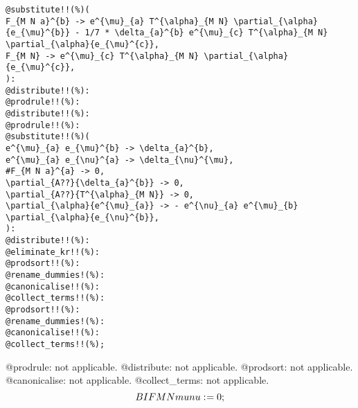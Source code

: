 \documentclass[11pt]{article}
\def\specialcolon{\mathrel{\mathop{:}}\hspace{-.5em}}
\begin{document}
{\color[named]{Blue}\begin{verbatim}
@substitute!!(%)(
F_{M N a}^{b} -> e^{\mu}_{a} T^{\alpha}_{M N} \partial_{\alpha}{e_{\mu}^{b}} - 1/7 * \delta_{a}^{b} e^{\mu}_{c} T^{\alpha}_{M N} \partial_{\alpha}{e_{\mu}^{c}},
F_{M N} -> e^{\mu}_{c} T^{\alpha}_{M N} \partial_{\alpha}{e_{\mu}^{c}},
):
@distribute!!(%):
@prodrule!!(%):
@distribute!!(%):
@prodrule!!(%):
@substitute!!(%)(
e^{\mu}_{a} e_{\mu}^{b} -> \delta_{a}^{b},
e^{\mu}_{a} e_{\nu}^{a} -> \delta_{\nu}^{\mu},
#F_{M N a}^{a} -> 0,
\partial_{A??}{\delta_{a}^{b}} -> 0,
\partial_{A??}{T^{\alpha}_{M N}} -> 0,
\partial_{\alpha}{e^{\mu}_{a}} -> - e^{\nu}_{a} e^{\mu}_{b} \partial_{\alpha}{e_{\nu}^{b}},
):
@distribute!!(%):
@eliminate_kr!!(%):
@prodsort!!(%):
@rename_dummies!(%):
@canonicalise!!(%):
@collect_terms!!(%):
@prodsort!!(%):
@rename_dummies!(%):
@canonicalise!!(%):
@collect_terms!!(%);
\end{verbatim}}
@prodrule: not applicable.
@distribute: not applicable.
@prodsort: not applicable.
@canonicalise: not applicable.
@collect\_terms: not applicable.
\begin{dmath*}[compact, spread=2pt]
BIFMNmunu\specialcolon{}= 0;
\end{dmath*}
\end{document}
